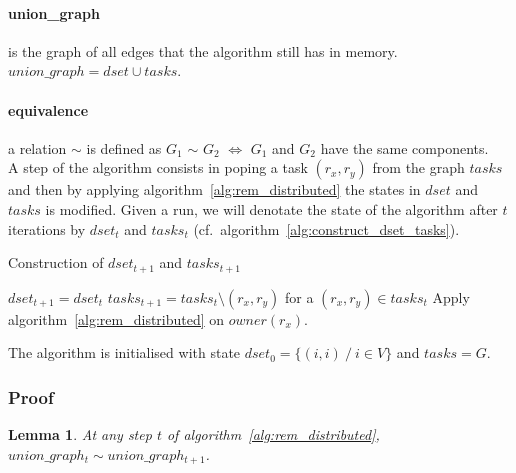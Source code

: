 \documentclass[12px]{article}
\newtheorem{lemma}[theorem]{Lemma}
\begin{document}
        \paragraph{union\_graph} is the graph of all edges that the algorithm still has in memory. $union\_graph = dset \cup tasks$.

        \paragraph{equivalence} a relation $\sim$ is defined as $G_1$ $\sim$ $G_2$ $\Leftrightarrow$ $G_1$ and $G_2$ have the same components. \\

        A step of the algorithm consists in poping a task $(r_x, r_y)$ from the graph $tasks$ and then by applying
        algorithm~\ref{alg:rem_distributed} the states in $dset$ and $tasks$ is modified.
        Given a run, we will denotate the state of the algorithm after $t$ iterations by $dset_t$ and $tasks_t$ (cf.\ algorithm~\ref{alg:construct_dset_tasks}).

        \begin{algorithm}
          \caption{Construction of $dset_{t+1}$ and $tasks_{t+1}$}%
          \label{alg:construct_dset_tasks}
          \begin{algorithmic}[1]
            \State $dset_{t+1} = dset_t$
            \State $tasks_{t+1} = tasks_t \setminus (r_x, r_y)$ for a $(r_x, r_y) \in tasks_t$
            \State Apply algorithm~\ref{alg:rem_distributed} on $owner(r_x)$.
          \end{algorithmic}
        \end{algorithm}

        The algorithm is initialised with state $dset_0 = \{(i, i)~/~i \in V\}$ and $tasks = G$.

      \subsubsection{Proof}
        \begin{lemma}%
          \label{lemma:transitivity}
          At any step $t$ of algorithm~\ref{alg:rem_distributed}, $union\_graph_t \sim union\_graph_{t+1}$.
        \end{lemma}
\end{document}
